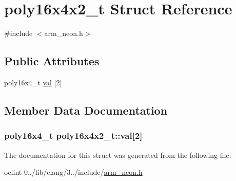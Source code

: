 \hypertarget{structpoly16x4x2__t}{\section{poly16x4x2\-\_\-t Struct Reference}
\label{structpoly16x4x2__t}
}


{\ttfamily \#include $<$arm\-\_\-neon.\-h$>$}

\subsection*{Public Attributes}
\begin{DoxyCompactItemize}
\item 
poly16x4\-\_\-t \hyperlink{structpoly16x4x2__t_ab02ff90ba945f5040ed9973a0461a750}{val} \mbox{[}2\mbox{]}
\end{DoxyCompactItemize}


\subsection{Member Data Documentation}
\hypertarget{structpoly16x4x2__t_ab02ff90ba945f5040ed9973a0461a750}{
\subsubsection[{val}]{\setlength{\rightskip}{0pt plus 5cm}poly16x4\-\_\-t poly16x4x2\-\_\-t\-::val\mbox{[}2\mbox{]}}}\label{structpoly16x4x2__t_ab02ff90ba945f5040ed9973a0461a750}


The documentation for this struct was generated from the following file\-:\begin{DoxyCompactItemize}
\item 
oclint-\/0../lib/clang/3../include/\hyperlink{arm__neon_8h}{arm\-\_\-neon.\-h}\end{DoxyCompactItemize}
